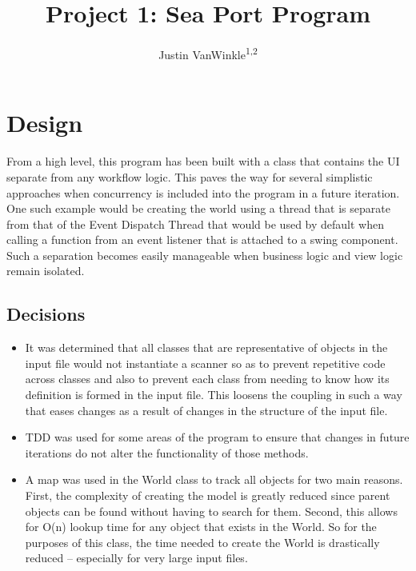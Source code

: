 \documentclass[english,floatsintext,man]{apa6}
\title{Project 1: Sea Port Program}
\author{Justin VanWinkle\textsuperscript{1,2}}
\affiliation{
    \vspace{0.5cm}
          \textsuperscript{1} University of Maryland University College\\
          \textsuperscript{2} Wycliffe Associates, Inc.  }
\providecommand{\tightlist}{%
  \setlength{\itemsep}{0pt}\setlength{\parskip}{0pt}}
\begin{document}
\maketitle

\setcounter{secnumdepth}{0}



\section{Design}\label{design}

From a high level, this program has been built with a class that
contains the UI separate from any workflow logic. This paves the way for
several simplistic approaches when concurrency is included into the
program in a future iteration. One such example would be creating the
world using a thread that is separate from that of the Event Dispatch
Thread that would be used by default when calling a function from an
event listener that is attached to a swing component. Such a separation
becomes easily manageable when business logic and view logic remain
isolated.

\subsection{Decisions}\label{decisions}

\begin{itemize}
\tightlist
\item
  It was determined that all classes that are representative of objects
  in the input file would not instantiate a scanner so as to prevent
  repetitive code across classes and also to prevent each class from
  needing to know how its definition is formed in the input file. This
  loosens the coupling in such a way that eases changes as a result of
  changes in the structure of the input file.
\item
  TDD was used for some areas of the program to ensure that changes in
  future iterations do not alter the functionality of those methods.
\item
  A map was used in the World class to track all objects for two main
  reasons. First, the complexity of creating the model is greatly
  reduced since parent objects can be found without having to search for
  them. Second, this allows for O(n) lookup time for any object that
  exists in the World. So for the purposes of this class, the time
  needed to create the World is drastically reduced -- especially for
  very large input files.
\end{itemize}
\end{document}

